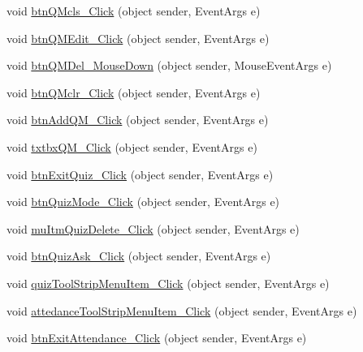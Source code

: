 \begin{DoxyCompactItemize}
void \hyperlink{class_sr_p___classroom_inq_1_1frm_classrrom_inq_a6e7cdcc66d0d497b1692085fe08917cd}{btn\-Q\-Mcls\-\_\-\-Click} (object sender, \-Event\-Args e)
\item 
void \hyperlink{class_sr_p___classroom_inq_1_1frm_classrrom_inq_a4a6869439b020d8519e10076c9583ebc}{btn\-Q\-M\-Edit\-\_\-\-Click} (object sender, \-Event\-Args e)
\item 
void \hyperlink{class_sr_p___classroom_inq_1_1frm_classrrom_inq_ad0002b32188c4505254a9230dec7fc23}{btn\-Q\-M\-Del\-\_\-\-Mouse\-Down} (object sender, \-Mouse\-Event\-Args e)
\item 
void \hyperlink{class_sr_p___classroom_inq_1_1frm_classrrom_inq_a5ecd75c32680d8896b6fcada275b474b}{btn\-Q\-Mclr\-\_\-\-Click} (object sender, \-Event\-Args e)
\item 
void \hyperlink{class_sr_p___classroom_inq_1_1frm_classrrom_inq_a61c2d094a64b65ae8b2adbd206c90326}{btn\-Add\-Q\-M\-\_\-\-Click} (object sender, \-Event\-Args e)
\item 
void \hyperlink{class_sr_p___classroom_inq_1_1frm_classrrom_inq_ad6c1b79ff1d79865275fac5a258deb2a}{txtbx\-Q\-M\-\_\-\-Click} (object sender, \-Event\-Args e)
\item 
void \hyperlink{class_sr_p___classroom_inq_1_1frm_classrrom_inq_a80183bae83a721931c21b4a8764dc289}{btn\-Exit\-Quiz\-\_\-\-Click} (object sender, \-Event\-Args e)
\item 
void \hyperlink{class_sr_p___classroom_inq_1_1frm_classrrom_inq_acfcbbf64f2bc2adf94eec18f45d2af2c}{btn\-Quiz\-Mode\-\_\-\-Click} (object sender, \-Event\-Args e)
\item 
void \hyperlink{class_sr_p___classroom_inq_1_1frm_classrrom_inq_ae486d5e846d21cf5c2616d4c0ad2e5bb}{mu\-Itm\-Quiz\-Delete\-\_\-\-Click} (object sender, \-Event\-Args e)
\item 
void \hyperlink{class_sr_p___classroom_inq_1_1frm_classrrom_inq_a62dfbfb357c98095e446b9a617c34ee9}{btn\-Quiz\-Ask\-\_\-\-Click} (object sender, \-Event\-Args e)
\item 
void \hyperlink{class_sr_p___classroom_inq_1_1frm_classrrom_inq_a73354017a84daba6bd3a574274f3904a}{quiz\-Tool\-Strip\-Menu\-Item\-\_\-\-Click} (object sender, \-Event\-Args e)
\item 
void \hyperlink{class_sr_p___classroom_inq_1_1frm_classrrom_inq_af4857322b8c22a02101857224e34e569}{attedance\-Tool\-Strip\-Menu\-Item\-\_\-\-Click} (object sender, \-Event\-Args e)
\item 
void \hyperlink{class_sr_p___classroom_inq_1_1frm_classrrom_inq_a5df71a30d5e80349884dd26718780e97}{btn\-Exit\-Attendance\-\_\-\-Click} (object sender, \-Event\-Args e)

\end{DoxyCompactItemize}
